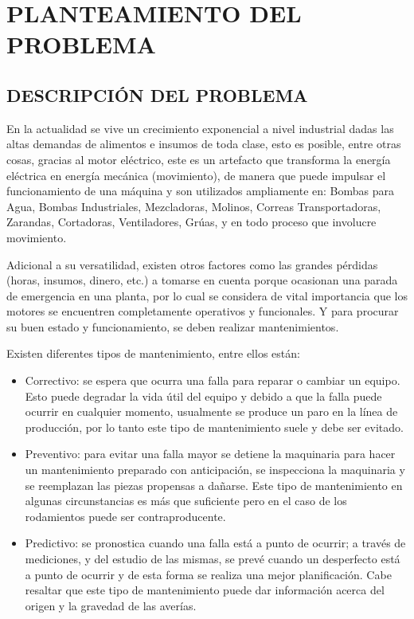 \thispagestyle{empty}
\setcounter{page}{5}

\section{PLANTEAMIENTO DEL PROBLEMA}

\subsection{DESCRIPCIÓN DEL PROBLEMA}

En la actualidad se vive un crecimiento exponencial a nivel industrial dadas
las altas demandas de alimentos e insumos de toda clase, esto es posible, entre
otras cosas, gracias al motor eléctrico, este es un artefacto que transforma la
energía eléctrica en energía mecánica (movimiento), de manera que puede
impulsar el funcionamiento de una máquina y son utilizados ampliamente en:
Bombas para Agua, Bombas Industriales, Mezcladoras, Molinos, Correas
Transportadoras, Zarandas, Cortadoras, Ventiladores, Grúas, y en todo proceso
que involucre movimiento.

Adicional a su versatilidad, existen otros factores como las grandes pérdidas
(horas, insumos, dinero, etc.) a tomarse en cuenta porque ocasionan una parada
de emergencia en una planta, por lo cual se considera de vital importancia que
los motores se encuentren completamente operativos y funcionales. Y para
procurar su buen estado y funcionamiento, se deben realizar mantenimientos.

Existen diferentes tipos de mantenimiento, entre ellos están:
\begin{itemize}

\item{Correctivo: se espera que ocurra una falla para reparar o cambiar un
    equipo. Esto puede degradar la vida útil del equipo y debido a que la falla
        puede ocurrir en cualquier momento, usualmente se produce un paro en la
        línea de producción, por lo tanto este tipo de mantenimiento suele y
        debe ser evitado.}

\item{Preventivo: para evitar una falla mayor se detiene la maquinaria para
    hacer un mantenimiento preparado con anticipación, se inspecciona la
        maquinaria y se reemplazan las piezas propensas a dañarse. Este tipo de
        mantenimiento en algunas circunstancias es más que suficiente pero en
        el caso de los rodamientos puede ser contraproducente.}

\item{Predictivo: se pronostica cuando una falla está a punto de ocurrir; a
    través de mediciones, y del estudio de las mismas, se prevé cuando un
        desperfecto está a punto de ocurrir y de esta forma se realiza una
        mejor planificación. Cabe resaltar que este tipo de mantenimiento puede
        dar información acerca del origen y la gravedad de las averías.}

\end{itemize}

